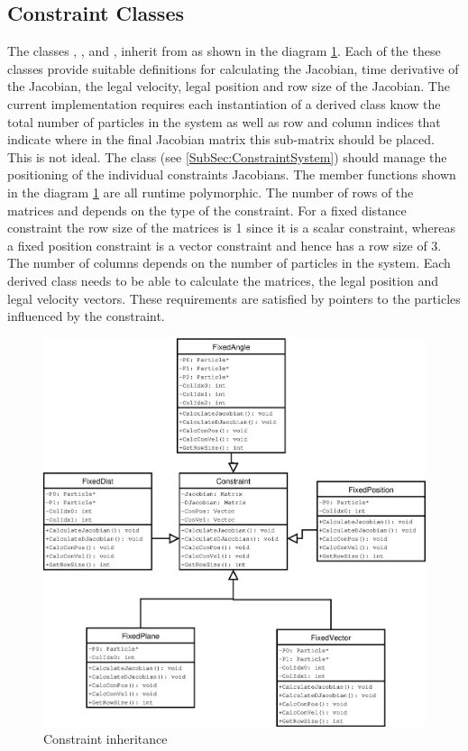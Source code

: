\subsection{Constraint Classes}
\label{SubSec:ConstraintClasses}
The classes , ,
 and , 
inherit from  as shown in the diagram
\ref{Fig:ConstraintDia}. Each of the these classes provide suitable definitions
for calculating the Jacobian, time derivative of the Jacobian, the legal
velocity, legal position and row size of the Jacobian. The current
implementation requires each instantiation of a  derived
class know the total number of particles in the system as well as row and column
indices that indicate where in the final Jacobian matrix this sub-matrix
should be placed. This is not ideal. The class 
(see \ref{SubSec:ConstraintSystem}) should manage the positioning of the
individual constraints Jacobians. The member functions shown in the diagram
\ref{Fig:ConstraintDia} are all runtime polymorphic. The number of rows of the
matrices  and
 depends on the type of the constraint. For a
fixed distance constraint the row size of the matrices is 1 since it is a scalar
constraint, whereas a fixed position constraint is a vector constraint and hence
has a row size of 3. The number of columns depends on the number of particles in
the system. Each  derived class needs to be able to
calculate the matrices, the legal position and legal velocity vectors. These
requirements are satisfied by pointers to the particles influenced by the
constraint.

\begin{figure}    
    \centering
    \includegraphics[height=0.8\textheight]{ConstraintDia}    
    \caption{\label{Fig:ConstraintDia}Constraint inheritance}
\end{figure}

